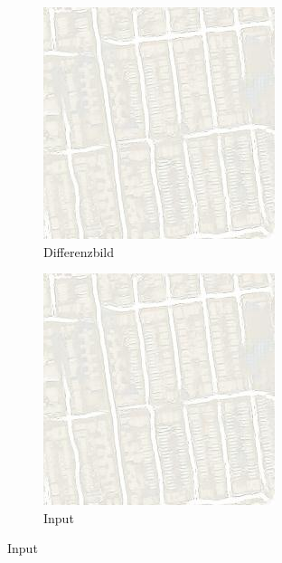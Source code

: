 \begin{figure}[ht]
\begin{subfigure}[t]{.14\textwidth}
  \end{subfigure}
  \begin{subfigure}[t]{.14\textwidth}
    \centering
    \caption*{Differenzbild}
    \includegraphics[width=\linewidth]{images/cycleGanResults/Maps19Ld120_E100_Lr0002.jpg}
  \end{subfigure}
  \hfill
  \begin{subfigure}[t]{.14\textwidth}
    \centering
    \caption*{Input}
    \includegraphics[width=\linewidth]{images/cycleGanResults/Maps19Ld120_E100_Lr0002.jpg}

\end{subfigure}
\end{figure}
